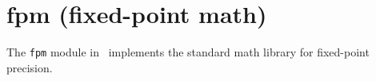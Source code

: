 % 
%

\newpage
\section{fpm (fixed-point math)}
\label{module:fft}
%
The {\tt fpm} module in \liquid\ implements the standard math library
for fixed-point precision.


